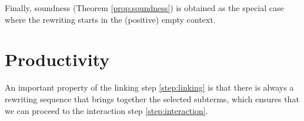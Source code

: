 
Finally, soundness (Theorem \ref{prop:soundness}) is obtained as the special
case where the rewriting starts in the (positive) empty context.






\section{Productivity}

An important property of the linking step \ref{step:linking} is that there is
always a rewriting sequence that brings together the selected subterms, which
ensures that we can proceed to the interaction step \ref{step:interaction}.


